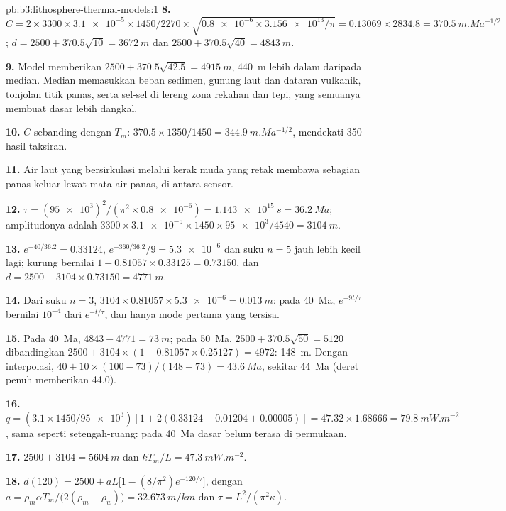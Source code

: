 \begin{solution}{pb:b3:lithosphere-thermal-models:1}
\textbf{8.} $C = 2\times3300\times\num{3.1e-5}\times1450/2270\times
\sqrt{\num{0.8e-6}\times\num{3.156e13}/\pi} = 0.13069\times2834.8 =
\qty{370.5}{m.Ma^{-1/2}}$; $d = 2500 + 370.5\sqrt{10} = \qty{3672}{m}$ dan
$2500 + 370.5\sqrt{40} = \qty{4843}{m}$.

\textbf{9.} Model memberikan $2500 + 370.5\sqrt{42.5} = \qty{4915}{m}$,
\qty{440}{m} lebih dalam daripada median. Median memasukkan beban
sedimen, gunung laut dan dataran vulkanik, tonjolan titik panas, serta
sel-sel di lereng zona rekahan dan tepi, yang semuanya membuat dasar
lebih dangkal.

\textbf{10.} $C$ sebanding dengan $T_m$: $370.5\times1350/1450 =
\qty{344.9}{m.Ma^{-1/2}}$, mendekati 350 hasil taksiran.

\textbf{11.} Air laut yang bersirkulasi melalui kerak muda yang retak membawa
sebagian panas keluar lewat mata air panas, di antara sensor.

\textbf{12.} $\tau = (\num{95e3})^2/(\pi^2\times\num{0.8e-6}) =
\qty{1.143e15}{s} = \qty{36.2}{Ma}$; amplitudonya adalah $3300\times
\num{3.1e-5}\times1450\times\num{95e3}/4540 = \qty{3104}{m}$.

\textbf{13.} $e^{-40/36.2} = 0.33124$, $e^{-360/36.2}/9 = \num{5.3e-6}$ dan
suku $n = 5$ jauh lebih kecil lagi; kurung bernilai $1 - 0.81057\times0.33125 =
0.73150$, dan $d = 2500 + 3104\times0.73150 = \qty{4771}{m}$.

\textbf{14.} Dari suku $n = 3$, $3104\times0.81057\times\num{5.3e-6} =
\qty{0.013}{m}$: pada \qty{40}{Ma}, $e^{-9t/\tau}$ bernilai $10^{-4}$ dari
$e^{-t/\tau}$, dan hanya mode pertama yang tersisa.

\textbf{15.} Pada \qty{40}{Ma}, $4843 - 4771 = \qty{73}{m}$; pada
\qty{50}{Ma}, $2500 + 370.5\sqrt{50} = 5120$ dibandingkan $2500 + 3104\times(1 -
0.81057\times0.25127) = 4972$: \qty{148}{m}. Dengan interpolasi, $40 + 10\times
(100 - 73)/(148 - 73) = \qty{43.6}{Ma}$, sekitar \qty{44}{Ma} (deret penuh
memberikan 44.0).

\textbf{16.} $q = (3.1\times1450/\num{95e3})[1 + 2(0.33124 + 0.01204 +
0.00005)] = 47.32\times1.68666 = \qty{79.8}{mW.m^{-2}}$, sama seperti
setengah-ruang: pada \qty{40}{Ma} dasar belum terasa di
permukaan.

\textbf{17.} $2500 + 3104 = \qty{5604}{m}$ dan $kT_m/L = \qty{47.3}{mW.m^{-2}}$.

\textbf{18.} $d(120) = 2500 + aL\bigl[1 - (8/\pi^2)e^{-120/\tau}\bigr]$, dengan
$a = \rho_m\alpha T_m/\bigl(2(\rho_m - \rho_w)\bigr) = \qty{32.673}{m/km}$ dan
$\tau = L^2/(\pi^2\kappa)$.


\end{solution}
